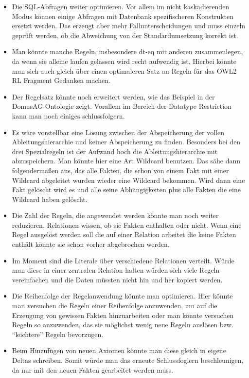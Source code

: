 \begin{itemize}
  \item Die SQL-Abfragen weiter optimieren. Vor allem im nicht kaskadierenden Modus können einige Abfragen mit Datenbank spezifischeren Konstrukten ersetzt werden. Das erzeugt aber mehr Fallunterscheidungen und muss einzeln geprüft werden, ob die Abweichung von der Standardumsetzung korrekt ist.
  \item Man könnte manche Regeln, insbesondere dt-eq mit anderen zusammenlegen, da wenn sie alleine laufen gelassen wird recht aufwendig ist. Hierbei könnte man sich auch gleich über einen optimaleren Satz an Regeln für das OWL2 RL Fragment Gedanken machen.
  \item Der Regelsatz könnte noch erweitert werden, wie das Beispiel in der DomusAG-Ontologie zeigt. Vorallem im Bereich der Datatype Restriction kann man noch einiges schlussfolgern.
  \item Es wäre vorstellbar eine Lösung zwischen der Abspeicherung der vollen Ableitungshierarchie und keiner Abspeicherung zu finden. Besonders bei den drei Spezialregeln ist der Aufwand hoch die Ableitungshierarchie mit abzuspeichern. Man könnte hier eine Art Wildcard benutzen. Das sähe dann folgendermaßen aus, das alle Fakten, die schon von einem Fakt mit einer Wildcard abgeleitet wurden wieder eine Wildcard bekommen. Wird dann eine Fakt gelöscht wird es und alle seine Abhängigkeiten plus alle Fakten die eine Wildcard haben gelöscht.
  \item Die Zahl der Regeln, die angewendet werden könnte man noch weiter reduzieren. Relationen wissen, ob sie Fakten enthalten oder nicht. Wenn eine Regel ausgelöst werden soll die auf einer Relation arbeitet die keine Fakten enthält könnte sie schon vorher abgebrochen werden.
  \item Im Moment sind die Literale über verschiedene Relationen verteilt. Würde man diese in einer zentralen Relation halten würden sich viele Regeln vereinfachen und die Daten müssten nicht hin und her kopiert werden.
  \item Die Reihenfolge der Regelanwendung könnte man optimieren. Hier könnte man versuchen die Regeln einer Reihenfolge anzuwenden, um auf die Erzeugung von gewissen Fakten hinzuarbeiten oder man könnte versuchen Regeln so anzuwenden, das sie möglichst wenig neue Regeln auslösen bzw. ``leichtere'' Regeln bevorzugen.
  \item Beim Hinzufügen von neuen Axiomen könnte man diese gleich in eigene Deltas schreiben. Somit würde man das erneute Schlussfoglern beschleunigen, da nur mit den neuen Fakten gearbeitet werden muss.

\end{itemize}
